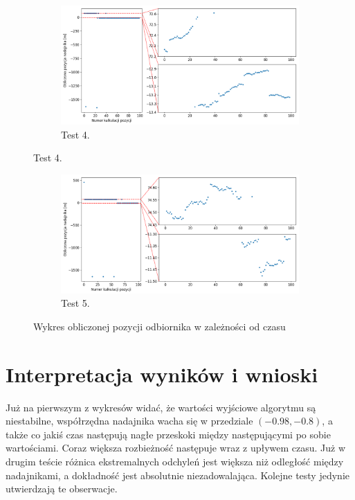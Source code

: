 \begin{figure}[H]
    \ContinuedFloat\centering
    \begin{subfigure}{\textwidth}\label{fig:position_3}
        \centering
        \includegraphics[width=\linewidth]{pics/position/position_3.png}
        \caption{Test 4.}
    \end{subfigure}
\end{figure}
\begin{figure}[H]
    \ContinuedFloat\centering
    \begin{subfigure}{\textwidth}\label{fig:position_4}
        \centering
        \includegraphics[width=\linewidth]{pics/position/position_4.png}
        \caption{Test 5.}
    \end{subfigure}
    \caption{Wykres obliczonej pozycji odbiornika w zależności od czasu}
    \label{fig:position}
\end{figure}

\section{Interpretacja wyników i wnioski}

Już na pierwszym z wykresów widać, że wartości wyjściowe algorytmu są niestabilne, współrzędna nadajnika wacha się w przedziale $(-0.98, -0.8)$, a także co jakiś czas następują nagłe przeskoki między następującymi po sobie wartościami. Coraz większa rozbieżność następuje wraz z upływem czasu. Już w drugim teście różnica ekstremalnych odchyleń jest większa niż odległość między nadajnikami, a dokładność jest absolutnie niezadowalająca. Kolejne testy jedynie utwierdzają te obserwacje.

